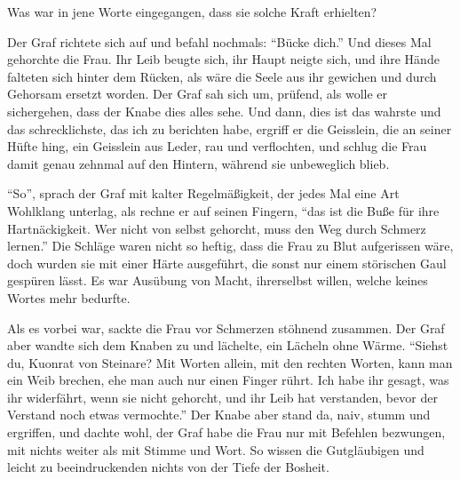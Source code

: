Was war in jene Worte eingegangen, dass sie solche Kraft erhielten?

Der Graf richtete sich auf und befahl nochmals: \enquote{Bücke dich.} Und dieses Mal gehorchte die Frau. Ihr Leib beugte sich, ihr Haupt neigte sich, und ihre Hände falteten sich hinter dem Rücken, als wäre die Seele aus ihr gewichen und durch Gehorsam ersetzt worden. Der Graf sah sich um, prüfend, als wolle er sichergehen, dass der Knabe dies alles sehe. Und dann, dies ist das wahrste und das schrecklichste, das ich zu berichten habe, ergriff er die \gls{Geisslein}, die an seiner Hüfte hing, ein \gls{Geisslein} aus Leder, rau und verflochten, und schlug die Frau damit genau zehnmal auf den Hintern, während sie unbeweglich blieb.

\enquote{So}, sprach der Graf mit kalter Regelmäßigkeit, der jedes Mal eine Art Wohlklang unterlag, als rechne er auf seinen Fingern, \enquote{das ist die Buße für ihre Hartnäckigkeit. Wer nicht von selbst gehorcht, muss den Weg durch Schmerz lernen.} Die Schläge waren nicht so heftig, dass die Frau zu Blut aufgerissen wäre, doch wurden sie mit einer Härte ausgeführt, die sonst nur einem störischen Gaul gespüren lässt. Es war Ausübung von Macht, ihrerselbst willen, welche keines Wortes mehr bedurfte.

Als es vorbei war, sackte die Frau vor Schmerzen stöhnend zusammen. Der Graf aber wandte sich dem Knaben zu und lächelte, ein Lächeln ohne Wärme. \enquote{Siehst du, \gls{Kuonrat von Steinare}? Mit Worten allein, mit den rechten Worten, kann man ein Weib brechen, ehe man auch nur einen Finger rührt. Ich habe ihr gesagt, was ihr widerfährt, wenn sie nicht gehorcht, und ihr Leib hat verstanden, bevor der Verstand noch etwas vermochte.} Der Knabe aber stand da, naiv, stumm und ergriffen, und dachte wohl, der Graf habe die Frau nur mit Befehlen bezwungen, mit nichts weiter als mit Stimme und Wort. So wissen die Gutgläubigen und leicht zu beeindruckenden nichts von der Tiefe der Bosheit.
